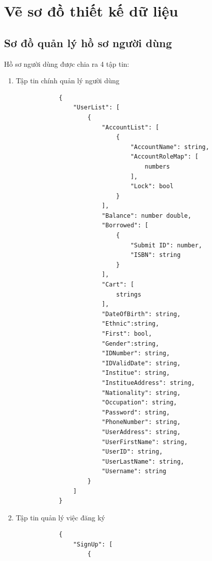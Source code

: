 \documentclass[12pt,a4paper]{report}
\begin{document}
    \section{Vẽ sơ đồ thiết kế dữ liệu}
        \subsection{Sơ đồ quản lý hồ sơ người dùng}
        Hồ sơ người dùng được chia ra 4 tập tin:
        \begin{enumerate}
            \item Tập tin chính quản lý người dùng
            \begin{verbatim}
            {
                "UserList": [
                    {
                        "AccountList": [
                            {
                                "AccountName": string,
                                "AccountRoleMap": [
                                    numbers
                                ],
                                "Lock": bool
                            }
                        ],
                        "Balance": number double,
                        "Borrowed": [
                            {
                                "Submit ID": number,
                                "ISBN": string
                            }
                        ],
                        "Cart": [
                            strings
                        ],
                        "DateOfBirth": string,
                        "Ethnic":string,
                        "First": bool,
                        "Gender":string,
                        "IDNumber": string,
                        "IDValidDate": string,
                        "Institue": string,
                        "InstitueAddress": string,
                        "Nationality": string,
                        "Occupation": string,
                        "Password": string,
                        "PhoneNumber": string,
                        "UserAddress": string,
                        "UserFirstName": string,
                        "UserID": string,
                        "UserLastName": string,
                        "Username": string
                    }
                ]
            }
            \end{verbatim}
            \newpage
            \item Tập tin quản lý việc đăng ký
            \begin{verbatim}
            {
                "SignUp": [
                    {

\end{verbatim}
\end{enumerate}
\end{document}
